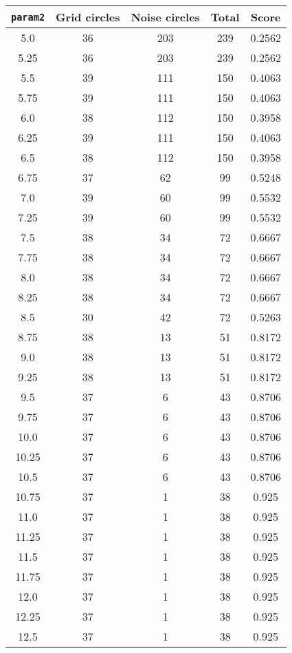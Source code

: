 \documentclass[letterpaper, 12pt]{article}
\begin{document}
\begin{longtable}{|c|c|c|c|c|}
\hline
\textbf{\texttt{param2}} & \textbf{Grid circles} & \textbf{Noise circles} & \textbf{Total} & \textbf{Score} \\
\hline
5.0 & 36 & 203 & 239 & 0.2562 \\
\hline
5.25 & 36 & 203 & 239 & 0.2562 \\
\hline
5.5 & 39 & 111 & 150 & 0.4063 \\
\hline
5.75 & 39 & 111 & 150 & 0.4063 \\
\hline
6.0 & 38 & 112 & 150 & 0.3958 \\
\hline
6.25 & 39 & 111 & 150 & 0.4063 \\
\hline
6.5 & 38 & 112 & 150 & 0.3958 \\
\hline
6.75 & 37 & 62 & 99 & 0.5248 \\
\hline
7.0 & 39 & 60 & 99 & 0.5532 \\
\hline
7.25 & 39 & 60 & 99 & 0.5532 \\
\hline
7.5 & 38 & 34 & 72 & 0.6667 \\
\hline
7.75 & 38 & 34 & 72 & 0.6667 \\
\hline
8.0 & 38 & 34 & 72 & 0.6667 \\
\hline
8.25 & 38 & 34 & 72 & 0.6667 \\
\hline
8.5 & 30 & 42 & 72 & 0.5263 \\
\hline
8.75 & 38 & 13 & 51 & 0.8172 \\
\hline
9.0 & 38 & 13 & 51 & 0.8172 \\
\hline
9.25 & 38 & 13 & 51 & 0.8172 \\
\hline
9.5 & 37 & 6 & 43 & 0.8706 \\
\hline
9.75 & 37 & 6 & 43 & 0.8706 \\
\hline
10.0 & 37 & 6 & 43 & 0.8706 \\
\hline
10.25 & 37 & 6 & 43 & 0.8706 \\
\hline
10.5 & 37 & 6 & 43 & 0.8706 \\
\hline
10.75 & 37 & 1 & 38 & 0.925 \\
\hline
11.0 & 37 & 1 & 38 & 0.925 \\
\hline
11.25 & 37 & 1 & 38 & 0.925 \\
\hline
11.5 & 37 & 1 & 38 & 0.925 \\
\hline
11.75 & 37 & 1 & 38 & 0.925 \\
\hline
12.0 & 37 & 1 & 38 & 0.925 \\
\hline
12.25 & 37 & 1 & 38 & 0.925 \\
\hline
12.5 & 37 & 1 & 38 & 0.925 \\

\end{longtable}
\end{document}
